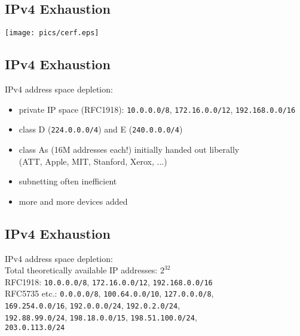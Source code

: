 \documentclass[xga]{xdvislides}
\begin{document}
\subsection{IPv4 Exhaustion}
\vspace*{\fill}
\begin{center}
	\texttt{[image: pics/cerf.eps]}
\end{center}
\vspace*{\fill}



\subsection{IPv4 Exhaustion}
IPv4 address space depletion: \\

\begin{itemize}
	\item private IP space (RFC1918): \verb+10.0.0.0/8+, \verb+172.16.0.0/12+, \verb+192.168.0.0/16+
	\item class D (\verb+224.0.0.0/4+) and E (\verb+240.0.0.0/4+)
	\item class As (16M addresses each!) initially handed out liberally \\
		(ATT, Apple, MIT, Stanford, Xerox, ...)
	\item subnetting often inefficient
	\item more and more devices added
\end{itemize}

\subsection{IPv4 Exhaustion}
IPv4 address space depletion: \\

Total theoretically available IP addresses: $2^{32}$
\\

RFC1918: {\tt 10.0.0.0/8}, {\tt 172.16.0.0/12}, {\tt 192.168.0.0/16}
\\

RFC5735 etc.: {\tt 0.0.0.0/8}, {\tt 100.64.0.0/10}, {\tt 127.0.0.0/8}, \\
{\tt 169.254.0.0/16}, {\tt 192.0.0.0/24}, {\tt 192.0.2.0/24}, \\
{\tt 192.88.99.0/24}, {\tt 198.18.0.0/15}, {\tt 198.51.100.0/24}, \\
{\tt 203.0.113.0/24}
\\
\end{document}
